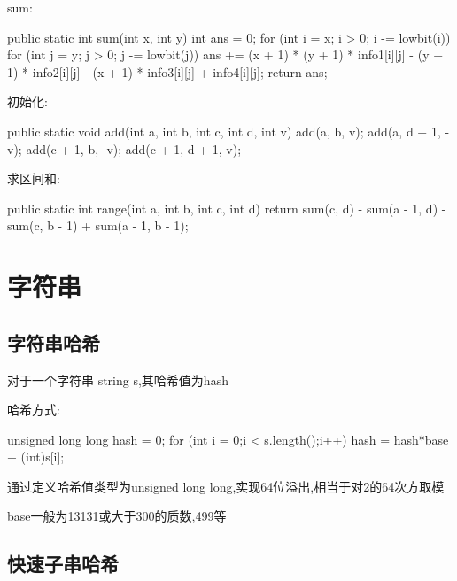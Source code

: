 \documentclass[UTF8,a4paper,11pt]{ctexart}
\newcommand{\topic}[1]{%
  \par\needspace{3\baselineskip}\vspace{0.45em}%
  \noindent{\bfseries\color{Primary}#1}\par\vspace{0.12em}%
}
\begin{document}
sum:

\begin{CodeBlock}
public static int sum(int x, int y) {
    int ans = 0;
    for (int i = x; i > 0; i -= lowbit(i)) {
        for (int j = y; j > 0; j -= lowbit(j)) {
            ans += (x + 1) * (y + 1) * info1[i][j]
                 - (y + 1) * info2[i][j]
                 - (x + 1) * info3[i][j]
                 + info4[i][j];
        }
    }
    return ans;
}
\end{CodeBlock}

初始化:

\begin{CodeBlock}
public static void add(int a, int b, int c, int d, int v) {
    add(a, b, v);
    add(a, d + 1, -v);
    add(c + 1, b, -v);
    add(c + 1, d + 1, v);
}
\end{CodeBlock}

求区间和:

\begin{CodeBlock}
public static int range(int a, int b, int c, int d) {
    return sum(c, d) - sum(a - 1, d) - sum(c, b - 1) + sum(a - 1, b - 1);
}
\end{CodeBlock}

\section{字符串}

\subsection{字符串哈希}

\topic{哈希值计算}

对于一个字符串 string s,其哈希值为hash

哈希方式:

\begin{CodeBlock}
unsigned long long hash = 0;
for (int i = 0;i < s.length();i++) {
    hash = hash*base + (int)s[i];
}
\end{CodeBlock}

通过定义哈希值类型为unsigned long long,实现64位溢出,相当于对2的64次方取模

base一般为13131或大于300的质数,499等

\subsection{快速子串哈希}

\topic{前缀哈希}
\end{document}
